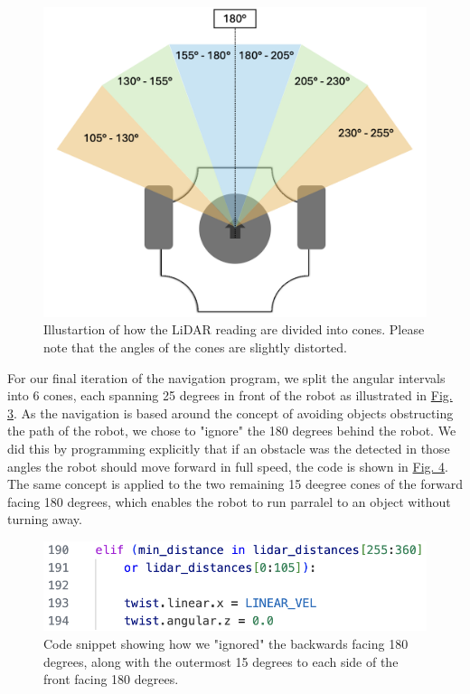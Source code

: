 \documentclass[conference]{IEEEtran}
\begin{document}
\begin{figure}[h]
    \centerline{\includegraphics[width=1.0\columnwidth]{Pictures/LiDAR Angels.png}}
    \caption{Illustartion of how the LiDAR reading are divided into cones.
    Please note that the angles of the cones are slightly distorted.}
    \label{sec:angles}
    \end{figure}

For our final iteration of the navigation program, we split the angular intervals into 6 cones, each spanning 25 degrees in front of the robot as illustrated in \href{sec:angles}{Fig. 3}. 
As the navigation is based around the concept of avoiding objects obstructing the path of the robot, we chose to "ignore" the 180 degrees behind the robot. 
We did this by programming explicitly that if an obstacle was the detected in those angles the robot should move forward in full speed, the code is shown in \href{sec:ignore}{Fig. 4}.
The same concept is applied to the two remaining 15 deegree cones of the forward facing 180 degrees, which enables the robot to run parralel to an object without turning away.

\begin{figure}[htbp]
    \centerline{\includegraphics[width=1.0\columnwidth\hspace{0.0cm}]{Pictures/ignore.png}}
    \caption{Code snippet showing how we "ignored" the backwards facing 180 degrees, along with the outermost 15 degrees to each side of the front facing 180 degrees.}
    \label{sec:ignore}
    \end{figure}
\end{document}
